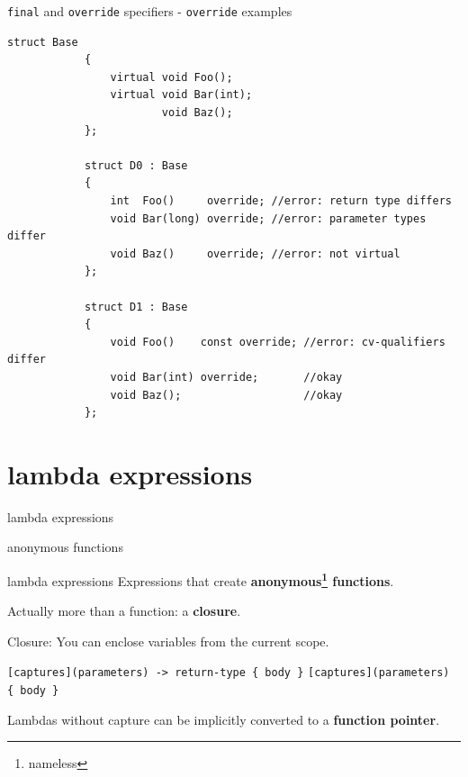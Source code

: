 	\begin{frame}[fragile=singleslide]{\lstinline|final| and \lstinline|override| specifiers - \lstinline|override| examples}
		\begin{lstlisting}[gobble=12]
			struct Base
			{
			    virtual void Foo();
			    virtual void Bar(int);
				        void Baz();
			};
			
			struct D0 : Base
			{
			    int  Foo()     override; //error: return type differs
			    void Bar(long) override; //error: parameter types differ
			    void Baz()     override; //error: not virtual
			};
			
			struct D1 : Base
			{
			    void Foo()    const override; //error: cv-qualifiers differ
			    void Bar(int) override;       //okay
			    void Baz();                   //okay
			};
		\end{lstlisting}
	\end{frame}
	
	\section{lambda expressions}
	\begin{frame}
		\begin{center}
			{\Huge lambda expressions}
			
			\emptyline
			{\Large anonymous functions}
		\end{center}
	\end{frame}
	
	\begin{frame}[fragile]{lambda expressions}
		Expressions that create \textbf{anonymous\footnote{nameless} functions}.
		
		Actually more than a function: a \textbf{closure}.
		
		\pause
		
		Closure: You can enclose variables from the current scope.
		
		\pause
		
		\emptyline
		\lstinline[deletekeywords={return}]|[captures](parameters) -> return-type { body }|
		\pause
		\lstinline                         |[captures](parameters) { body }    | \hint{(return type deduced)}
		
		\pause
		
		\emptyline
		Lambdas without capture can be implicitly converted to a \textbf{function pointer}.
	\end{frame}
	
